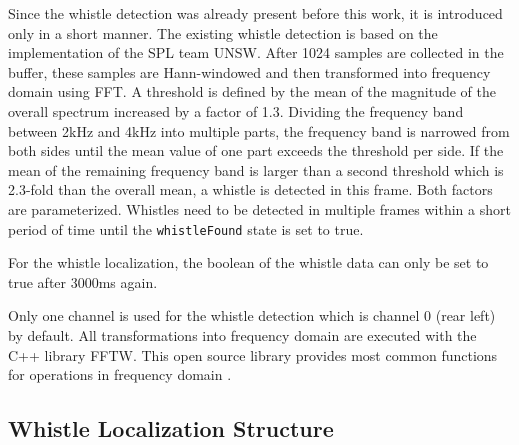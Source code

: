 Since the whistle detection was already present before this work,
it is introduced only in a short manner.
The existing whistle detection is based on the implementation of the \ac{SPL}
team \ac{UNSW}.
After 1024 samples are collected in the buffer, these samples are Hann-windowed
and then transformed into frequency domain using \ac{FFT}.
A threshold is defined by the mean of the magnitude of the overall spectrum increased
by a factor of 1.3. 
Dividing the frequency band between 2\si{\kilo\hertz} and 4\si{\kilo\hertz}
into multiple parts, the frequency band is narrowed from both sides until
the mean value of one part exceeds the threshold per side.
If the mean of the remaining frequency band is larger than a second threshold
which is 2.3-fold than the overall mean, a whistle is detected in this frame. 
Both factors are parameterized.
Whistles need to be detected in multiple  frames within a short period of time 
until the \lstinline!whistleFound! state is set to true.

For the whistle localization, the boolean of the whistle data can only be set to true
after 3000\si{\milli\second} again.  

Only one channel is used for the whistle detection which is channel 0
(rear left) by default. 
All transformations into frequency domain are executed with the C++ library
\ac{FFTW}.
This open source library provides most common functions for operations
in frequency domain .

\subsection{Whistle Localization Structure}
\label{subsec:03_whistleLocalizationStructure}


